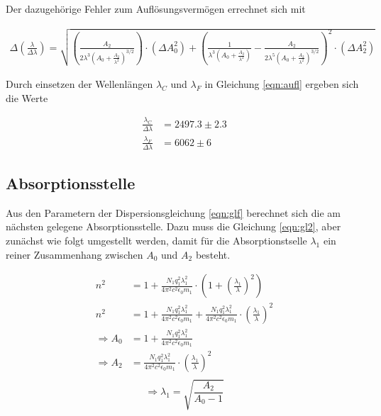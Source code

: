 Der dazugehörige Fehler zum Auflösungsvermögen errechnet sich mit

\begin{align*}
  \Delta \left(\frac{\lambda}{\Delta \lambda}\right) = \sqrt{\left(\frac{A_2}{2 \lambda^3 \left(A_0 + \frac{A_2}{\lambda^2}\right)^{3/2}}\right) \cdot \left(\Delta A_0^2\right) + \left(\frac{1}{\lambda^3 \left(A_0 + \frac{A_2}{\lambda^2}\right)} - \frac{A_2}{2 \lambda^5 \left(A_0 + \frac{A_2}{\lambda^2}\right)^{3/2}}\right)^2 \cdot \left(\Delta A_2^2\right)}
\end{align*}

Durch einsetzen der Wellenlängen $\lambda_C$ und $\lambda_F$ in Gleichung \ref{eqn:aufl} ergeben sich die Werte

\begin{align*}
  \frac{\lambda_C}{\Delta \lambda} &= 2497.3 \pm 2.3 \\
  \frac{\lambda_F}{\Delta \lambda} &= 6062 \pm 6
\end{align*}

\subsection{Absorptionsstelle}

Aus den Parametern der Dispersionsgleichung \ref{eqn:glf} berechnet sich die am nächsten gelegene Absorptionsstelle.
Dazu muss die Gleichung \ref{eqn:gl2}, aber zunächst wie folgt umgestellt werden, damit für die Absorptionstselle $\lambda_1$ ein reiner Zusammenhang zwischen $A_0$ und $A_2$ besteht.

\begin{align*}
  n^2 &= 1 + \frac{N_1 q_1^2 \lambda_1^2}{4 \pi^2 c^2 \epsilon_0 m_1}\cdot\left(1+\left(\frac{\lambda_1}{\lambda}\right)^2\right) \\
  n^2 &= 1 + \frac{N_1 q_1^2 \lambda_1^2}{4 \pi^2 c^2 \epsilon_0 m_1} + \frac{N_1 q_1^2 \lambda_1^2}{4 \pi^2 c^2 \epsilon_0 m_1} \cdot \left(\frac{\lambda_1}{\lambda}\right)^2 \\
  \Rightarrow A_0 &= 1 + \frac{N_1 q_1^2 \lambda_1^2}{4 \pi^2 c^2 \epsilon_0 m_1} \\
  \Rightarrow A_2 &= \frac{N_1 q_1^2 \lambda_1^2}{4 \pi^2 c^2 \epsilon_0 m_1} \cdot \left(\frac{\lambda_1}{\lambda}\right)^2 \\
\end{align*}
\begin{equation}
  \Rightarrow \lambda_1 = \sqrt{\frac{A_2}{A_0-1}}
  \label{eqn:ausw1}
\end{equation}

